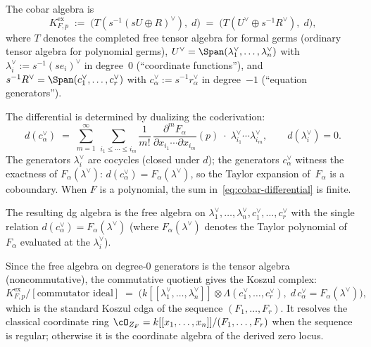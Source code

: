 \begin{construction}
\label{constr:cobar-jacobi}
The cobar algebra is
\[
K^{\mathrm{ex}}_{F,p}
\;:=\; \bigl(T(s^{-1}(sU \oplus R)^\vee),\; d\bigr)
\;=\; \bigl(T(U^\vee \oplus s^{-1}R^\vee),\; d\bigr),
\]
where $T$ denotes the completed free tensor algebra for formal germs
(ordinary tensor algebra for polynomial germs), $U^\vee = \Span(\lambda_1^\vee,
\ldots, \lambda_n^\vee)$ with $\lambda_i^\vee := s^{-1}(se_i)^\vee$
in degree~$0$ (``coordinate functions''), and
$s^{-1}R^\vee = \Span(c_1^\vee, \ldots, c_r^\vee)$ with
$c_\alpha^\vee := s^{-1}r_\alpha^\vee$ in degree~$-1$
(``equation generators'').

The differential is determined by dualizing the coderivation:
\begin{equation}\label{eq:cobar-differential}
d(c_\alpha^\vee)
\;=\; \sum_{m=1}^{\infty}\, \sum_{i_1 \leq \cdots \leq i_m}
\frac{1}{m!}\,
\frac{\partial^m F_\alpha}{\partial x_{i_1} \cdots \partial x_{i_m}}(p)
\;\cdot\; \lambda_{i_1}^\vee \cdots \lambda_{i_m}^\vee,
\qquad
d(\lambda_i^\vee) = 0.
\end{equation}
The generators $\lambda_i^\vee$ are cocycles (closed under $d$);
the generators $c_\alpha^\vee$ witness the exactness of $F_\alpha(\lambda^\vee)$:
$d(c_\alpha^\vee) = F_\alpha(\lambda^\vee)$, so the Taylor expansion
of~$F_\alpha$ is a coboundary. When $F$ is a polynomial, the sum
in~\eqref{eq:cobar-differential} is finite.

The resulting dg algebra is the free algebra on
$\lambda_1^\vee, \ldots, \lambda_n^\vee, c_1^\vee, \ldots, c_r^\vee$
with the single relation $d(c_\alpha^\vee) = F_\alpha(\lambda^\vee)$
(where $F_\alpha(\lambda^\vee)$ denotes the Taylor polynomial
of~$F_\alpha$ evaluated at the $\lambda_i^\vee$).

Since the free algebra on degree-$0$ generators is the tensor algebra
(noncommutative), the commutative quotient gives the Koszul complex:
\[
K^{\mathrm{ex}}_{F,p} / [\text{commutator ideal}]
\;=\; \bigl(k[[\lambda_1^\vee, \ldots, \lambda_n^\vee]]
\otimes \Lambda(c_1^\vee, \ldots, c_r^\vee),\;
d\, c_\alpha^\vee = F_\alpha(\lambda^\vee)\bigr),
\]
which is the standard Koszul cdga of the sequence
\((F_1,\ldots,F_r)\). It resolves the classical coordinate ring
\(\cO_{Z_F}=k[[x_1,\ldots,x_n]]/(F_1,\ldots,F_r)\) when the sequence
is regular; otherwise it is the coordinate algebra of the derived zero
locus.
\end{construction}

